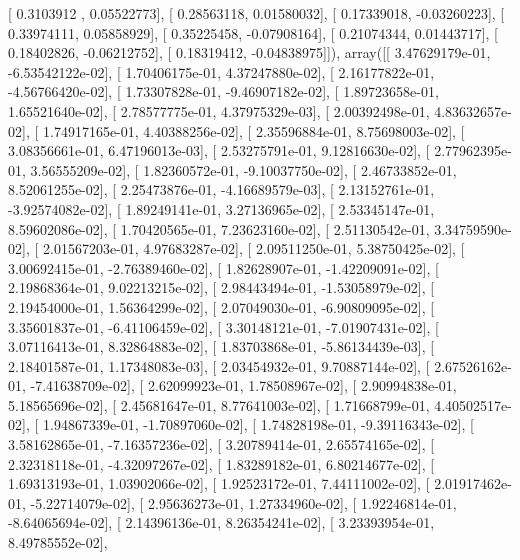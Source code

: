 \documentclass{article}
\begin{document}
       [ 0.3103912 ,  0.05522773],
       [ 0.28563118,  0.01580032],
       [ 0.17339018, -0.03260223],
       [ 0.33974111,  0.05858929],
       [ 0.35225458, -0.07908164],
       [ 0.21074344,  0.01443717],
       [ 0.18402826, -0.06212752],
       [ 0.18319412, -0.04838975]]), array([[  3.47629179e-01,  -6.53542122e-02],
       [  1.70406175e-01,   4.37247880e-02],
       [  2.16177822e-01,  -4.56766420e-02],
       [  1.73307828e-01,  -9.46907182e-02],
       [  1.89723658e-01,   1.65521640e-02],
       [  2.78577775e-01,   4.37975329e-03],
       [  2.00392498e-01,   4.83632657e-02],
       [  1.74917165e-01,   4.40388256e-02],
       [  2.35596884e-01,   8.75698003e-02],
       [  3.08356661e-01,   6.47196013e-03],
       [  2.53275791e-01,   9.12816630e-02],
       [  2.77962395e-01,   3.56555209e-02],
       [  1.82360572e-01,  -9.10037750e-02],
       [  2.46733852e-01,   8.52061255e-02],
       [  2.25473876e-01,  -4.16689579e-03],
       [  2.13152761e-01,  -3.92574082e-02],
       [  1.89249141e-01,   3.27136965e-02],
       [  2.53345147e-01,   8.59602086e-02],
       [  1.70420565e-01,   7.23623160e-02],
       [  2.51130542e-01,   3.34759590e-02],
       [  2.01567203e-01,   4.97683287e-02],
       [  2.09511250e-01,   5.38750425e-02],
       [  3.00692415e-01,  -2.76389460e-02],
       [  1.82628907e-01,  -1.42209091e-02],
       [  2.19868364e-01,   9.02213215e-02],
       [  2.98443494e-01,  -1.53058979e-02],
       [  2.19454000e-01,   1.56364299e-02],
       [  2.07049030e-01,  -6.90809095e-02],
       [  3.35601837e-01,  -6.41106459e-02],
       [  3.30148121e-01,  -7.01907431e-02],
       [  3.07116413e-01,   8.32864883e-02],
       [  1.83703868e-01,  -5.86134439e-03],
       [  2.18401587e-01,   1.17348083e-03],
       [  2.03454932e-01,   9.70887144e-02],
       [  2.67526162e-01,  -7.41638709e-02],
       [  2.62099923e-01,   1.78508967e-02],
       [  2.90994838e-01,   5.18565696e-02],
       [  2.45681647e-01,   8.77641003e-02],
       [  1.71668799e-01,   4.40502517e-02],
       [  1.94867339e-01,  -1.70897060e-02],
       [  1.74828198e-01,  -9.39116343e-02],
       [  3.58162865e-01,  -7.16357236e-02],
       [  3.20789414e-01,   2.65574165e-02],
       [  2.32318118e-01,  -4.32097267e-02],
       [  1.83289182e-01,   6.80214677e-02],
       [  1.69313193e-01,   1.03902066e-02],
       [  1.92523172e-01,   7.44111002e-02],
       [  2.01917462e-01,  -5.22714079e-02],
       [  2.95636273e-01,   1.27334960e-02],
       [  1.92246814e-01,  -8.64065694e-02],
       [  2.14396136e-01,   8.26354241e-02],
       [  3.23393954e-01,   8.49785552e-02],
\end{document}
